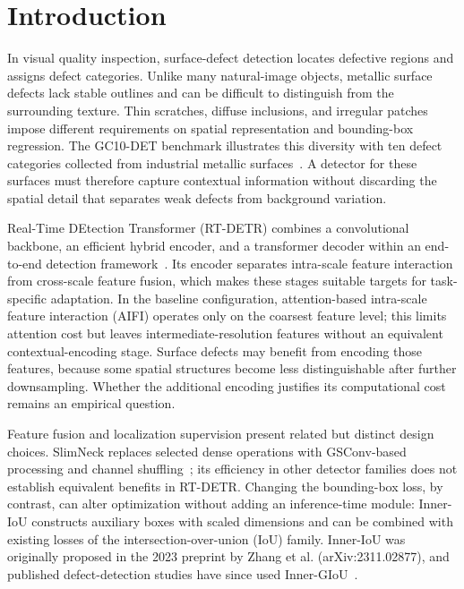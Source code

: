 \documentclass[pdflatex,sn-mathphys-num,iicol]{sn-jnl}
\begin{document}
\maketitle

\section{Introduction}\label{sec:introduction}

In visual quality inspection, surface-defect detection locates defective regions and assigns defect categories. Unlike many natural-image objects, metallic surface defects lack stable outlines and can be difficult to distinguish from the surrounding texture. Thin scratches, diffuse inclusions, and irregular patches impose different requirements on spatial representation and bounding-box regression. The GC10-DET benchmark illustrates this diversity with ten defect categories collected from industrial metallic surfaces~\cite{lv2020gc10}. A detector for these surfaces must therefore capture contextual information without discarding the spatial detail that separates weak defects from background variation.

Real-Time DEtection Transformer (RT-DETR) combines a convolutional backbone, an efficient hybrid encoder, and a transformer decoder within an end-to-end detection framework~\cite{zhao2024rtdetr}. Its encoder separates intra-scale feature interaction from cross-scale feature fusion, which makes these stages suitable targets for task-specific adaptation. In the baseline configuration, attention-based intra-scale feature interaction (AIFI) operates only on the coarsest feature level; this limits attention cost but leaves intermediate-resolution features without an equivalent contextual-encoding stage. Surface defects may benefit from encoding those features, because some spatial structures become less distinguishable after further downsampling. Whether the additional encoding justifies its computational cost remains an empirical question.

Feature fusion and localization supervision present related but distinct design choices. SlimNeck replaces selected dense operations with GSConv-based processing and channel shuffling~\cite{li2024slimneck}; its efficiency in other detector families does not establish equivalent benefits in RT-DETR. Changing the bounding-box loss, by contrast, can alter optimization without adding an inference-time module: Inner-IoU constructs auxiliary boxes with scaled dimensions and can be combined with existing losses of the intersection-over-union (IoU) family. Inner-IoU was originally proposed in the 2023 preprint by Zhang et al. (arXiv:2311.02877), and published defect-detection studies have since used Inner-GIoU~\cite{ji2025msdetr,chen2025gfrtdetr}.
\end{document}
